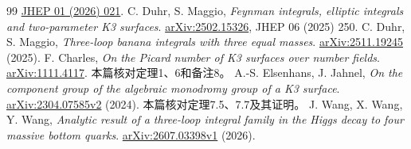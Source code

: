 \documentclass[11pt,a4paper]{ctexart}
\theoremstyle{cnplain}\newtheorem{theorem}{定理}[section]
\theoremstyle{definition}\newtheorem{definition}[theorem]{定义}
\theoremstyle{remark}\newtheorem{remark}[theorem]{注}
\begin{document}
\begin{thebibliography}{99}
\href{https://doi.org/10.1007/JHEP01(2026)021}{JHEP 01 (2026) 021}.
C. Duhr, S. Maggio,
\emph{Feynman integrals, elliptic integrals and two-parameter K3 surfaces}.
\href{https://arxiv.org/abs/2502.15326}{arXiv:2502.15326}, JHEP 06 (2025) 250.
C. Duhr, S. Maggio,
\emph{Three-loop banana integrals with three equal masses}.
\href{https://arxiv.org/abs/2511.19245}{arXiv:2511.19245} (2025).
F. Charles,
\emph{On the Picard number of K3 surfaces over number fields}.
\href{https://arxiv.org/abs/1111.4117}{arXiv:1111.4117}.
本篇核对定理1、6和备注8。
A.-S. Elsenhans, J. Jahnel,
\emph{On the component group of the algebraic monodromy group of a K3 surface}.
\href{https://arxiv.org/abs/2304.07585v2}{arXiv:2304.07585v2} (2024).
本篇核对定理7.5、7.7及其证明。
J. Wang, X. Wang, Y. Wang,
\emph{Analytic result of a three-loop integral family in the Higgs decay to four massive bottom quarks}.
\href{https://arxiv.org/abs/2607.03398v1}{arXiv:2607.03398v1} (2026).
\end{thebibliography}
\end{document}

